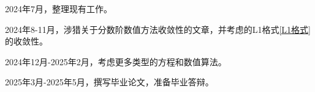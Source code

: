 2024年7月，整理现有工作。

2024年8-11月，涉猎关于分数阶数值方法收敛性的文章，并考虑\mainEquation 的L1格式\eqref{L1格式}的收敛性。

2024年12月-2025年2月，考虑更多类型的方程和数值算法。

2025年3月-2025年5月，撰写毕业论文，准备毕业答辩。
